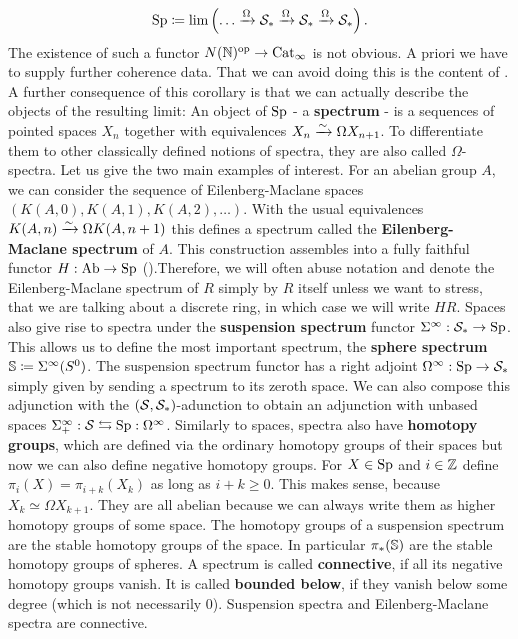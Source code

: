\begin{equation*}
    \Sp\coloneqq \lim\left( \dots\xrightarrow{\Omega}\Spc_* \xrightarrow{\Omega} \Spc_* \xrightarrow{\Omega}\Spc_* \right).
\end{equation*}
The existence of such a functor $N(\N)^{\op}\ra \Cat_\infty$ is not obvious. 
A priori we have to supply further coherence data. That we can avoid doing this is the content of \cite[Corollary~7.3.17]{cisinski2019higher}. A further consequence of this corollary is that we can actually describe the objects of the resulting limit:
An object of $\Sp$ - a \textbf{spectrum} -  is a sequences of pointed spaces $X_n$ together with equivalences $X_n\rai \Omega X_{n+1}$. To differentiate them to other classically defined notions of spectra, they are also called $\Omega$-spectra.
Let us give the two main examples of interest. For an abelian group $A$, we can consider the sequence of Eilenberg-Maclane spaces $\left( K(A,0), K(A,1), K(A,2),\dots \right)$. With the usual equivalences $K(A,n)\rai \Omega K(A,n+1)$ this defines a spectrum called the \textbf{Eilenberg-Maclane spectrum }of $A$. 
This construction assembles into a fully faithful functor $H:\Ab\ra \Sp$ (\cite[Example~1.3.3.5]{lurie2017higher}).Therefore, we will often abuse notation and denote the Eilenberg-Maclane spectrum of $R$ simply by $R$ itself unless we want to stress, that we are talking about a discrete ring, in which case we will write $HR$. Spaces also give rise to spectra under the \textbf{suspension spectrum} functor $\Sigma^{\infty}:\Spc_*\ra \Sp$. 
This allows us to define the most important spectrum, the \textbf{sphere spectrum} $\S\coloneqq \Sigma^{\infty}(S^0)$. The suspension spectrum functor has a right adjoint $\Omega^\infty:\Sp\to\Spc_*$ simply given by sending a spectrum to its zeroth space. We can also compose this adjunction with the $(\Spc,\Spc_*)$-adunction to obtain an adjunction with unbased spaces $\sip:\Spc\leftrightarrows\Sp:\Omega^\infty$.
Similarly to spaces, spectra also have \textbf{homotopy groups}, which are defined via the ordinary homotopy groups of their spaces but now we can also define negative homotopy groups. For $X\in \Sp$ and $i\in\Z$ define $\pi_i(X)=\pi_{i+k}(X_k)$ as long as $i+k\geq 0$. This makes sense, because $X_k\simeq \Omega X_{k+1}$. They are all abelian because we can always write them as higher homotopy groups of some space.
The homotopy groups of a suspension spectrum are the stable homotopy groups of the space. In particular $\pi_*(\S)$ are the stable homotopy groups of spheres. A spectrum is called \textbf{connective}, if all its negative homotopy groups vanish. It is called \textbf{bounded below}, if they vanish below some degree (which is not necessarily 0). Suspension spectra and Eilenberg-Maclane spectra are connective.
